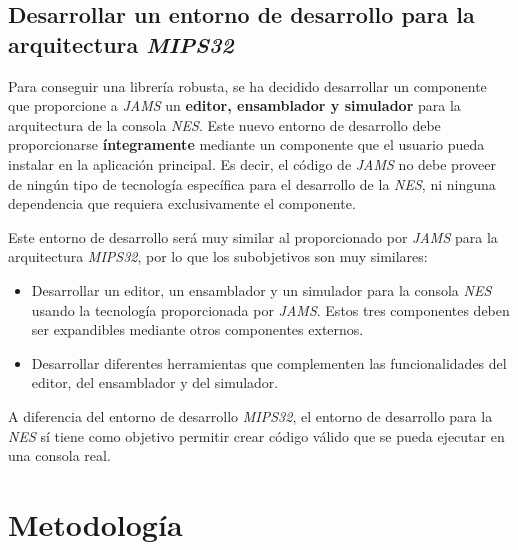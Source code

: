 \subsection{Desarrollar un entorno de desarrollo para la arquitectura \textit{MIPS32}}
\label{subsec:desarrollar-un-entorno-de-desarrollo-para-la-arquitectura-mips32}

Para conseguir una librería robusta, se ha decidido desarrollar un componente
que proporcione a \textit{JAMS} un \textbf{editor, ensamblador y simulador}
para la arquitectura de la consola \textit{NES}.
Este nuevo entorno de desarrollo debe proporcionarse \textbf{íntegramente}
mediante un componente que el usuario pueda instalar en la aplicación
principal.
Es decir, el código de \textit{JAMS} no debe proveer de ningún
tipo de tecnología específica para el desarrollo de la \textit{NES},
ni ninguna dependencia que requiera exclusivamente el componente.

 Este entorno de desarrollo será muy similar al proporcionado
por \textit{JAMS} para la arquitectura \textit{MIPS32}, por lo que los
subobjetivos son muy similares:

\begin{itemize}
    \item Desarrollar un editor, un ensamblador y un simulador
    para la consola \textit{NES} usando la tecnología
    proporcionada por \textit{JAMS}.
    Estos tres componentes deben ser expandibles mediante otros componentes externos.
    \item Desarrollar diferentes herramientas que complementen las funcionalidades
    del editor, del ensamblador y del simulador.
\end{itemize}

 A diferencia del entorno de desarrollo \textit{MIPS32}, el entorno
de desarrollo para la \textit{NES} sí tiene como objetivo permitir crear
código válido que se pueda ejecutar en una consola real.


\section{Metodología}\label{sec:metodologia}

